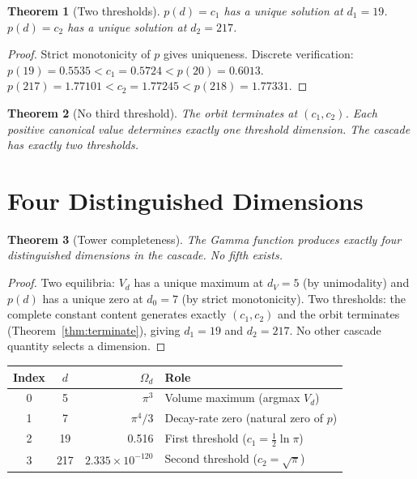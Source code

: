 \documentclass[11pt,a4paper]{article}
\newtheorem{theorem}{Theorem}[section]
\begin{document}
\begin{theorem}[Two thresholds]\label{thm:thresholds}
$p(d) = c_1$ has a unique solution at $d_1 = 19$.\;
$p(d) = c_2$ has a unique solution at $d_2 = 217$.
\end{theorem}

\begin{proof}
Strict monotonicity of $p$ gives uniqueness. Discrete verification:
$p(19) = 0.5535 < c_1 = 0.5724 < p(20) = 0.6013$.
$p(217) = 1.77101 < c_2 = 1.77245 < p(218) = 1.77331$.
\end{proof}

\begin{theorem}[No third threshold]
The orbit terminates at $(c_1, c_2)$. Each positive canonical value
determines exactly one threshold dimension. The cascade has exactly two
thresholds.
\end{theorem}

\section{Four Distinguished Dimensions}

\begin{theorem}[Tower completeness]\label{thm:tower}
The Gamma function produces exactly four distinguished dimensions in the
cascade. No fifth exists.
\end{theorem}

\begin{proof}
Two equilibria: $V_d$ has a unique maximum at $d_V = 5$ (by unimodality)
and $p(d)$ has a unique zero at $d_0 = 7$ (by strict monotonicity). Two thresholds: the
complete constant content generates exactly $(c_1, c_2)$ and the orbit
terminates (Theorem~\ref{thm:terminate}), giving $d_1 = 19$ and
$d_2 = 217$. No other cascade quantity selects a dimension.
\end{proof}

\begin{center}
\begin{tabular}{ccrl}
\toprule
Index & $d$ & $\Omega_d$ & Role \\
\midrule
0 & 5 & $\pi^3$ & Volume maximum (argmax $V_d$) \\
1 & 7 & $\pi^4/3$ & Decay-rate zero (natural zero of $p$) \\
2 & 19 & 0.516 & First threshold ($c_1 = \tfrac{1}{2}\ln\pi$) \\
3 & 217 & $2.335\times 10^{-120}$ &
Second threshold ($c_2 = \sqrt{\pi}$) \\
\bottomrule
\end{tabular}
\end{center}
\end{document}
